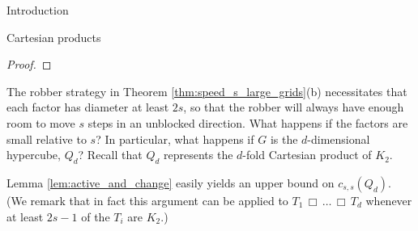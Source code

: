 \documentclass[12pt]{amsart}
\newcommand{\comment}[1]{\textcolor{red}{#1}}
\theoremstyle{definition}
\def\cart{\, \Box \,}
\newcommand{\speeds}{c_{s,s}}
\begin{document}
\begin{section}{Introduction}
\begin{section}{Cartesian products}
\begin{proof}
    
\end{proof}

The robber strategy in Theorem \ref{thm:speed_s_large_grids}(b) necessitates that each factor has diameter at least $2s$, so that the robber will always have enough room to move $s$ steps in an unblocked direction.  What happens if the factors are small relative to $s$?  In particular, what happens if $G$ is the $d$-dimensional hypercube, $Q_d$?  Recall that $Q_d$ represents the $d$-fold Cartesian product of $K_2$.

Lemma \ref{lem:active_and_change} easily yields an upper bound on $\speeds(Q_d)$.  (We remark that in fact this argument can be applied to $T_1 \cart \dots \cart T_d$ whenever at least $2s-1$ of the $T_i$ are $K_2$.)


\end{section}
\end{section}
\end{document}
